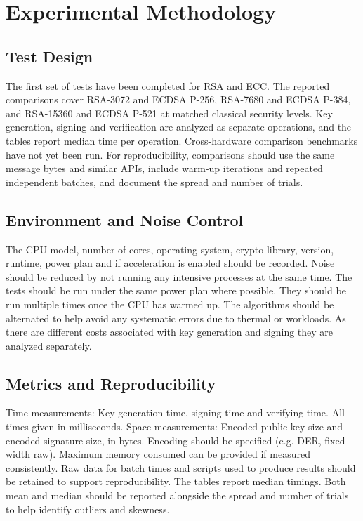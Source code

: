 \documentclass[conference]{IEEEtran}
\begin{document}
\section{Experimental Methodology}\label{AA}

\subsection{Test Design}

The first set of tests have been completed for RSA and ECC. The reported comparisons cover RSA-3072 and ECDSA P-256, RSA-7680 and ECDSA P-384, and RSA-15360 and ECDSA P-521 at matched classical security levels. Key generation, signing and verification are analyzed as separate operations, and the tables report median time per operation. Cross-hardware comparison benchmarks have not yet been run. For reproducibility, comparisons should use the same message bytes and similar APIs, include warm-up iterations and repeated independent batches, and document the spread and number of trials.

\subsection{Environment and Noise Control}

The CPU model, number of cores, operating system, crypto library, version, runtime, power plan and if acceleration is enabled should be recorded. Noise should be reduced by not running any intensive processes at the same time. The tests should be run under the same power plan where possible. They should be run multiple times once the CPU has warmed up. The algorithms should be alternated to help avoid any systematic errors due to thermal or workloads. As there are different costs associated with key generation and signing they are analyzed separately.

\subsection{Metrics and Reproducibility}

Time measurements: Key generation time, signing time and verifying time. All times given in milliseconds. Space measurements: Encoded public key size and encoded signature size, in bytes. Encoding should be specified (e.g. DER, fixed width raw). Maximum memory consumed can be provided if measured consistently. Raw data for batch times and scripts used to produce results should be retained to support reproducibility. The tables report median timings. Both mean and median should be reported alongside the spread and number of trials to help identify outliers and skewness.
\end{document}
